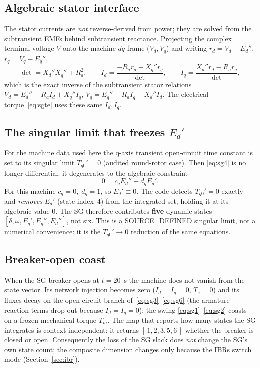 \documentclass[12pt,a4paper]{article}
\begin{document}
\subsection{Algebraic stator interface}
The stator currents are \emph{not} reverse-derived from power; they are solved
from the subtransient EMFs behind subtransient reactance. Projecting the complex
terminal voltage $V$ onto the machine $dq$ frame ($V_d,V_q$) and writing
$r_d=V_d-E_d''$, $r_q=V_q-E_q''$,
\begin{equation}
  \det=X_d''X_q''+R_a^2,\qquad
  I_d=\frac{-R_a r_d - X_q'' r_q}{\det},\qquad
  I_q=\frac{X_d'' r_d - R_a r_q}{\det},
  \label{eq:stator}
\end{equation}
which is the exact inverse of the subtransient stator relations
$V_d=E_d''-R_a I_d+X_q'' I_q$, $V_q=E_q''-R_a I_q-X_d'' I_d$. The electrical
torque~\eqref{eq:sgte} uses these same $I_d,I_q$.

\subsection{The singular limit that freezes $E_d'$}\label{sec:frozen}
For the machine data used here the q-axis transient open-circuit time constant is
set to its singular limit $T_{q0}'=0$ (audited round-rotor case). Then
\eqref{eq:sg4} is no longer differential: it degenerates to the algebraic
constraint
\begin{equation}
  0 = c_q E_d'' - d_q E_d'.
\end{equation}
For this machine $c_q=0,\;d_q=1$, so $E_d'\equiv 0$. The code detects
$T_{q0}'=0$ exactly and \emph{removes} $E_d'$ (state index~4) from the integrated
set, holding it at its algebraic value $0$. The SG therefore contributes
\textbf{five} dynamic states $[\delta,\omega,E_q',E_q'',E_d'']$, not six. This is
a \textsf{SOURCE\_DEFINED} singular limit, not a numerical convenience: it is the
$T_{q0}'\to0$ reduction of the same equations.

\subsection{Breaker-open coast}
When the SG breaker opens at $t=20$~s the machine does not vanish from the state
vector. Its network injection becomes zero ($I_d=I_q=0$, $T_e=0$) and its fluxes
decay on the open-circuit branch of~\eqref{eq:sg3}--\eqref{eq:sg6} (the
armature-reaction terms drop out because $I_d=I_q=0$); the swing
\eqref{eq:sg1}--\eqref{eq:sg2} coasts on a frozen mechanical torque $T_m$. The
map that reports how many states the SG integrates is context-independent: it
returns $[\,1,2,3,5,6\,]$ whether the breaker is closed or open. Consequently the
loss of the SG slack does \emph{not} change the SG's own state count; the
composite dimension changes only because the IBRs switch mode
(Section~\ref{sec:ibr}).
\end{document}
